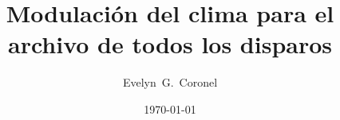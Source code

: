 



\title{Modulación del clima para el archivo de todos los disparos}
\author{Evelyn~G.~Coronel}


\date[]{\lowercase{\today}} %


\maketitle





